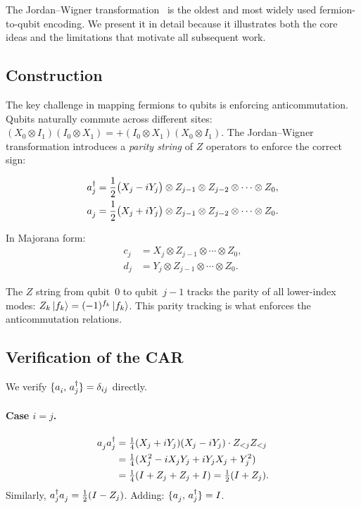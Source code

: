 %

The Jordan--Wigner transformation~\cite{jordan1928} is the oldest and
most widely used fermion-to-qubit encoding.  We present it in detail
because it illustrates both the core ideas and the limitations that
motivate all subsequent work.

\subsection{Construction}
\label{sec:jw-construction}

The key challenge in mapping fermions to qubits is enforcing
anticommutation.  Qubits naturally commute across different sites:
$(X_0 \otimes I_1)(I_0 \otimes X_1) = +(I_0 \otimes X_1)(X_0 \otimes I_1)$.
The Jordan--Wigner transformation introduces a \emph{parity string} of
$Z$ operators to enforce the correct sign:

\begin{align}
  \ad{j} &= \frac{1}{2}\bigl(X_j - iY_j\bigr) \otimes
    Z_{j-1} \otimes Z_{j-2} \otimes \cdots \otimes Z_0, \\
  \an{j} &= \frac{1}{2}\bigl(X_j + iY_j\bigr) \otimes
    Z_{j-1} \otimes Z_{j-2} \otimes \cdots \otimes Z_0.
  \label{eq:jw-ladder}
\end{align}

In Majorana form:
\begin{align}
  c_j &= X_j \otimes Z_{j-1} \otimes \cdots \otimes Z_0, \\
  d_j &= Y_j \otimes Z_{j-1} \otimes \cdots \otimes Z_0.
  \label{eq:jw-majorana}
\end{align}

The $Z$ string from qubit~0 to qubit~$j{-}1$ tracks the parity of
all lower-index modes: $Z_k\ket{f_k} = (-1)^{f_k}\ket{f_k}$.  This
parity tracking is what enforces the anticommutation relations.

\subsection{Verification of the CAR}
\label{sec:jw-car}

We verify $\acomm{\an{i}}{\ad{j}} = \delta_{ij}$ directly.

\paragraph{Case $i = j$.}
\begin{align*}
  \an{j}\ad{j} &= \tfrac{1}{4}(X_j + iY_j)(X_j - iY_j)
    \cdot Z_{<j} Z_{<j} \\
  &= \tfrac{1}{4}(X_j^2 - iX_jY_j + iY_jX_j + Y_j^2) \\
  &= \tfrac{1}{4}(I + Z_j + Z_j + I) = \tfrac{1}{2}(I + Z_j).
\end{align*}
Similarly, $\ad{j}\an{j} = \tfrac{1}{2}(I - Z_j)$.  Adding:
$\acomm{\an{j}}{\ad{j}} = I$. \checkmark

